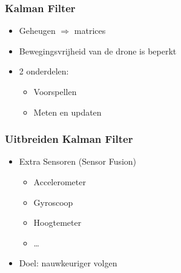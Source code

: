 \documentclass{beamer}
\begin{document}
  \begin{frame}
    \frametitle{Kalman Filter}
    \begin{itemize}
      \item Geheugen $\Rightarrow$ matrices
      \item Bewegingsvrijheid van de drone is beperkt
      \item 2 onderdelen:
        \begin{itemize}
          \item Voorspellen
          \item Meten en updaten
        \end{itemize}
    \end{itemize}
  \end{frame}
  \begin{frame}
    \frametitle{Uitbreiden Kalman Filter}
    \begin{itemize}
      \item Extra Sensoren (Sensor Fusion)
        \begin{itemize}
          \item Accelerometer
          \item Gyroscoop
          \item Hoogtemeter
          \item \ldots
        \end{itemize}
      \item Doel: nauwkeuriger volgen
    \end{itemize}
  \end{frame}
\end{document}
